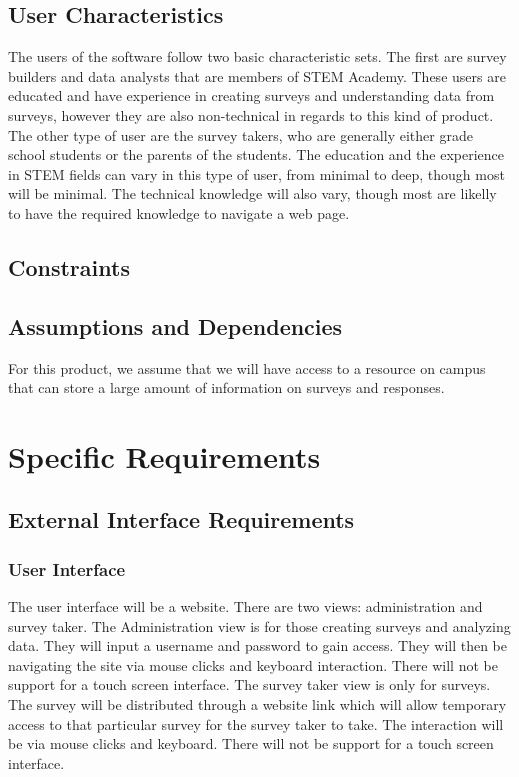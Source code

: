 \documentclass[letterpaper,10pt,titlepage, draftclsnofoot,onecolumn]{IEEEtran}
\begin{document}
\subsection{User Characteristics}
The users of the software follow two basic characteristic sets. The first are survey builders and data analysts that are members of
STEM Academy. These users are educated and have experience in creating surveys and understanding data from surveys,
however they are also non-technical in regards to this kind of product. The other type of user are the survey takers, who are
generally either grade school students or the parents of the students. The education and the experience in STEM fields
can vary in this type of user, from minimal to deep, though most will be minimal. The technical knowledge will also vary, though
most are likelly to have the required knowledge to navigate a web page.
\subsection{Constraints}
\subsection{Assumptions and Dependencies}
For this product, we assume that we will have access to a resource on campus that can store a large amount of information on
surveys and responses. %
\section{Specific Requirements}
\subsection{External Interface Requirements}
\subsubsection{User Interface}
The user interface will be a website. There are two views: administration and survey taker. 
The Administration view is for those creating surveys and analyzing data. They will input a 
username and password to gain access. They will then be navigating the site via mouse clicks 
and keyboard interaction. There will not be support for a touch screen interface. The survey
taker view is only for surveys. The survey will be distributed through a website link which 
will allow temporary access to that particular survey for the survey taker to take. The 
interaction will be via mouse clicks and keyboard. There will not be support for a touch screen
interface.
\end{document}
